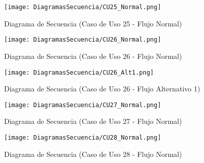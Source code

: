 \begin{landscape}
  \label{fig:Secuencia_CU25_Normal}
  \vspace*{\fill}
  \begin{figure}[!htbp]
    \centering
    \texttt{[image: DiagramasSecuencia/CU25\_Normal.png]}
    \caption{Diagrama de Secuencia (Caso de Uso 25 - Flujo Normal)}
  \end{figure}
  \vfill
\end{landscape}
\FloatBarrier

\begin{landscape}
  \label{fig:Secuencia_CU26_Normal}
  \vspace*{\fill}
  \begin{figure}[!htbp]
    \centering
    \texttt{[image: DiagramasSecuencia/CU26\_Normal.png]}
    \caption{Diagrama de Secuencia (Caso de Uso 26 - Flujo Normal)}
  \end{figure}
  \vfill
\end{landscape}
\FloatBarrier

\begin{landscape}
  \label{fig:Secuencia_CU26_Alt1}
  \vspace*{\fill}
  \begin{figure}[!htbp]
    \centering
    \texttt{[image: DiagramasSecuencia/CU26\_Alt1.png]}
    \caption{Diagrama de Secuencia (Caso de Uso 26 - Flujo Alternativo 1)}
  \end{figure}
  \vfill
\end{landscape}
\FloatBarrier

\begin{landscape}
  \label{fig:Secuencia_CU27_Normal}
  \vspace*{\fill}
  \begin{figure}[!htbp]
    \centering
    \texttt{[image: DiagramasSecuencia/CU27\_Normal.png]}
    \caption{Diagrama de Secuencia (Caso de Uso 27 - Flujo Normal)}
  \end{figure}
  \vfill
\end{landscape}
\FloatBarrier

\begin{landscape}
  \label{fig:Secuencia_CU28_Normal}
  \vspace*{\fill}
  \begin{figure}[!htbp]
    \centering
    \texttt{[image: DiagramasSecuencia/CU28\_Normal.png]}
    \caption{Diagrama de Secuencia (Caso de Uso 28 - Flujo Normal)}
  \end{figure}
  \vfill
\end{landscape}
\FloatBarrier

